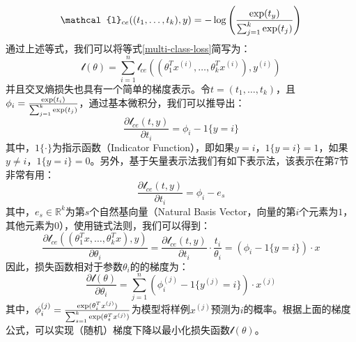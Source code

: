 \documentclass[letterpaper,11pt]{report}
\numberwithin{equation}{section}
\begin{document}
\begin{CJK}{UTF8}{gbsn}
  \begin{equation}
    \mathcal{l}_{ce}((t_1,\ldots,t_k),y)=-\log \left( \frac{{\rm exp}(t_y)}{\sum^k_{j=1}{\rm{exp}} (t_j)} \right)
  \end{equation}
  通过上述等式，我们可以将等式\eqref{multi-class-loss}简写为：
  \begin{equation}
    \mathcal{l}(\theta) = \sum^n_{i=1} \mathcal{l}_{ce}((\theta_1^T x^{(i)},\ldots,\theta_k^T x^{(i)}),y^{(i)})
  \end{equation}
  并且交叉熵损失也具有一个简单的梯度表示。令$t=(t_1,\ldots,t_k)$，且$\phi_i=\frac{{\rm exp}(t_i)}{\sum^k_{j=1}{\rm exp}(t_j)}$，通过基本微积分，我们可以推导出：
  \begin{equation}
    \frac{ \partial \mathcal{l}_{ce}(t,y)}{\partial t_i}=\phi_i - 1 \{ y=i \}
  \end{equation}
  其中，$1\{\cdot\}$为指示函数（Indicator Function），即如果$y=i$，$1\{y=i\}=1$，如果$y \ne i$，$1\{y=i\}=0$。另外，基于矢量表示法我们有如下表示法，该表示在第7节非常有用：
  \begin{equation}
    \frac{ \partial \mathcal{l}_{ce}(t,y)}{\partial t_i}=\phi_i - e_s
  \end{equation}
  其中，$e_s \in \mathbb{R}^k$为第$s$个自然基向量（Natural Basis Vector，向量的第$i$个元素为$1$，其他元素为$0$），使用链式法则，我们可以得到：
  \begin{equation}
    \frac{\partial \mathcal{l}_{ce}((\theta_1^T x,\ldots,\theta_k^T x),y)}{\partial \theta_i}=\frac{ \partial \mathcal{l}_{ce}(t,y)}{\partial t_i} \cdot \frac{t_i}{\theta_i} = (\phi_i - 1 \{ y=i \}) \cdot x
  \end{equation}
  因此，损失函数相对于参数$\theta_i$的的梯度为：
  \begin{equation}
    \frac{ \partial \mathcal{l}(\theta)}{\partial \theta_i} = \sum^n_{j=1} (\phi_i^{(j)} - 1 \{ y^{(j)}=i \}) \cdot x^{(j)}
  \end{equation}
  其中，$\phi_i^{(j)}=\frac{{\rm{exp}} (\theta_{i}^T x^{(j)})}{\sum^k_{s=1}{\rm{exp}} (\theta_s^T x^{(j)})}$为模型将样例$x^{(j)}$预测为$i$的概率。根据上面的梯度公式，可以实现（随机）梯度下降以最小化损失函数$\mathcal{l}(\theta)$。
\end{CJK}
\end{document}
